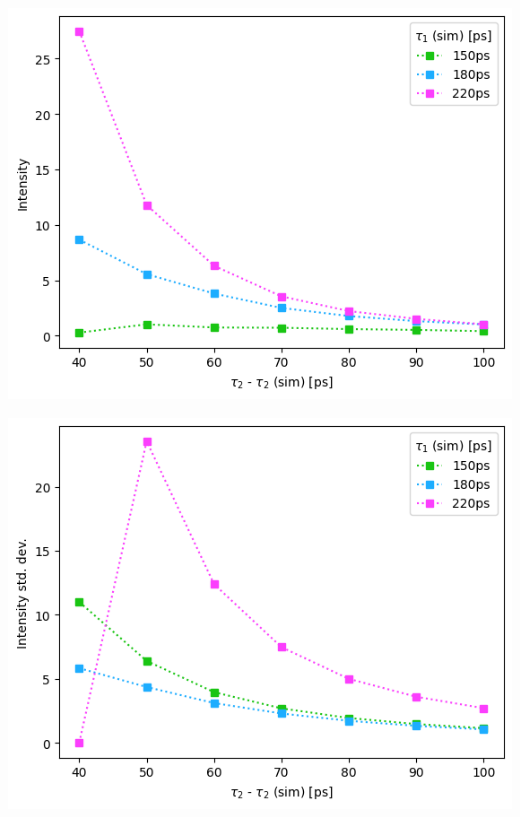 \begin{minipage}{.5\linewidth}
    \centering
    \includegraphics[width=\linewidth]{Batch 3/regular IRF/8020-diff i1.png}
    \label{fig:comp-I-8020}
\end{minipage}
\begin{minipage}{.5\linewidth}
    \centering
    \includegraphics[width=\linewidth]{Batch 3/regular IRF/8020-err i1.png}
    \label{fig:comp-Ierr-8020}
\end{minipage}